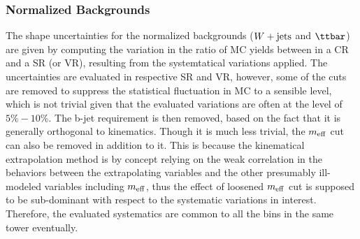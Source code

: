 \subsubsection{Normalized Backgrounds} \label{sec:Uncertainties::normalizedBG}
%
The shape uncertainties for the normalized backgrounds ($W+\mathrm{jets}$ and $\ttbar$) are given by computing the variation in the ratio of MC yields between in a CR and a SR (or VR), resulting from the systemtatical variations applied.
The uncertainties are evaluated in respective SR and VR, however, some of the cuts are removed to suppress the statistical fluctuation in MC to a sensible level, which is not trivial given that the evaluated variations are often at the level of $5\%-10\%$.
The b-jet requirement is then removed, based on the fact that it is generally orthogonal to kinematics.
Though it is much less trivial, the $m_{\mathrm{eff}}$ cut can also be removed in addition to it. 
This is because the kinematical extrapolation method is by concept relying on the weak correlation in the behaviors between the extrapolating variables and the other presumably ill-modeled variables including $m_{\mathrm{eff}}$, thus the effect of loosened $m_{\mathrm{eff}}$ cut is supposed to be sub-dominant with respect to the systematic variations in interest.
%
Therefore, the evaluated systematics are common to all the bins in the same tower eventually. \\

